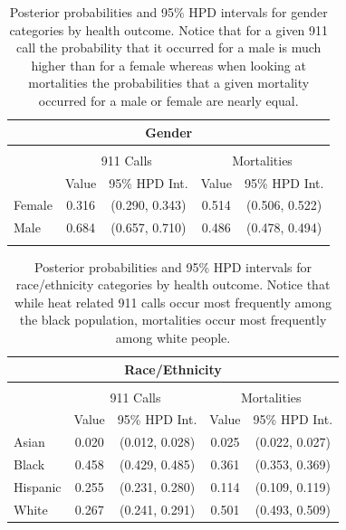 \documentclass[final]{statsoc}
\begin{document}
\begin{table}
  \caption{Posterior probabilities and 95\% HPD intervals for gender categories by health outcome. Notice that for a given 911 call the probability that it occurred for a male is much higher than for a female whereas when looking at mortalities the probabilities that a given mortality occurred for a male or female are nearly equal.}
  \label{gendertab}
    \centering
    \begin{tabular}{@{\extracolsep{5pt}} lcccc}\\[-1.8ex]
    \multicolumn{5}{c}{Gender} \\
    \hline
    \hline \\[-1.8ex]
       & \multicolumn{2}{c}{911 Calls} & \multicolumn{2}{c}{Mortalities} \\
       \hline
       & Value & 95\% HPD Int. & Value & 95\% HPD Int. \\
       \hline
      Female & 0.316 & (0.290, 0.343) & 0.514 & (0.506, 0.522) \\
      Male & 0.684 & (0.657, 0.710) & 0.486 & (0.478, 0.494) \\
      \hline \\[-1.8ex]
    \end{tabular}
\end{table}

\begin{table}
  \caption{Posterior probabilities and 95\% HPD intervals for race/ethnicity categories by health outcome. Notice that while heat related 911 calls occur most frequently among the black population, mortalities occur most frequently among white people.}
  \label{ethnicitytab}
  \centering
    \begin{tabular}{@{\extracolsep{5pt}} lcccc}\\[-1.8ex]
    \multicolumn{5}{c}{Race/Ethnicity} \\
    \hline \hline \\[-1.8ex]
    & \multicolumn{2}{c}{911 Calls} & \multicolumn{2}{c}{Mortalities} \\
    \hline
    & Value & 95\% HPD Int. & Value & 95\% HPD Int. \\
    \hline
    Asian & 0.020 & (0.012, 0.028) & 0.025 & (0.022, 0.027) \\
    Black & 0.458 & (0.429, 0.485) & 0.361 & (0.353, 0.369) \\
    Hispanic & 0.255 & (0.231, 0.280) & 0.114 & (0.109, 0.119) \\
    White & 0.267 & (0.241, 0.291) & 0.501 & (0.493, 0.509) \\
    \hline    
    \end{tabular}
\end{table} 
\end{document}

